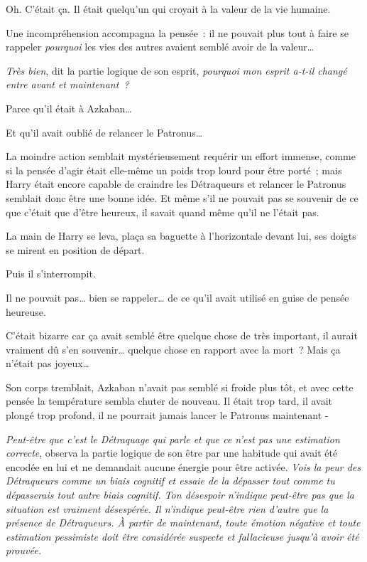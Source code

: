 Oh. C'était ça. Il était quelqu'un qui croyait à la valeur de la vie humaine.

 Une incompréhension accompagna la pensée~: il ne pouvait plus tout à faire se rappeler \emph{pourquoi} les vies des autres avaient semblé avoir de la valeur…

\emph{Très bien}, dit la partie logique de son esprit, \emph{pourquoi mon esprit a-t-il changé entre avant et maintenant~?}

Parce qu'il était à Azkaban…

Et qu'il avait oublié de relancer le Patronus…

La moindre action semblait mystérieusement requérir un effort immense, comme si la pensée d'agir était elle-même un poids trop lourd pour être porté~; mais Harry était encore capable de craindre les Détraqueurs et relancer le Patronus semblait donc être une bonne idée. Et même s'il ne pouvait pas se souvenir de ce que c'était que d'être heureux, il savait quand même qu'il ne l'était pas.

La main de Harry se leva, plaça sa baguette à l'horizontale devant lui, ses doigts se mirent en position de départ.

Puis il s'interrompit.

Il ne pouvait pas… bien se rappeler… de ce qu'il avait utilisé en guise de pensée heureuse.

C'était bizarre car ça avait semblé être quelque chose de très important, il aurait vraiment dû s'en souvenir… quelque chose en rapport avec la mort~? Mais ça n'était pas joyeux…

Son corps tremblait, Azkaban n'avait pas semblé si froide plus tôt, et avec cette pensée la température sembla chuter de nouveau. Il était trop tard, il avait plongé trop profond, il ne pourrait jamais lancer le Patronus maintenant -

\emph{Peut-être que c'est le Détraquage qui parle et que ce n'est pas une estimation correcte}, observa la partie logique de son être par une habitude qui avait été encodée en lui et ne demandait aucune énergie pour être activée. \emph{Vois la peur des Détraqueurs comme un biais cognitif et essaie de la dépasser tout comme tu dépasserais tout autre biais cognitif. Ton désespoir n'indique peut-être pas que la situation est vraiment désespérée. Il n'indique peut-être rien d'autre que la présence de Détraqueurs. À partir de maintenant, toute émotion négative et toute estimation pessimiste doit être considérée suspecte et fallacieuse jusqu'à avoir été prouvée.}

